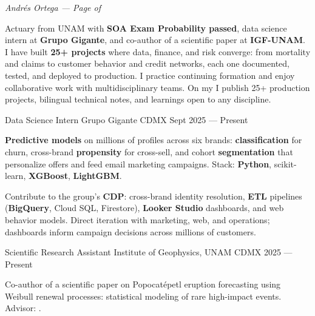 \documentclass[10pt, letterpaper]{awesome-cv}
\renewcommand{\acvSectionContentTopSkip}{0.3mm}
\renewenvironment{cvparagraph}{%
  \vspace{\acvSectionContentTopSkip}%
  \vspace{-3mm}%
  \paragraphstyle%
}{%
  \par%
  \vspace{0.3mm}%
}
\renewcommand*{\paragraphstyle}{\fontsize{8.5pt}{1.15em}\bodyfontlight\upshape\color{text}}
\begin{document}
\makecvheader[C]


\makecvfooter
  {}
  {\color{lightgray}\textit{\small Andrés Ortega — Page \thepage{} of \pageref*{LastPage}}}
  {}


\begin{cvparagraph}
Actuary from UNAM with \textbf{SOA Exam Probability passed}, data science intern at \textbf{Grupo Gigante}, and co-author of a scientific paper at \textbf{IGF-UNAM}. I have built \textbf{25+ projects} where data, finance, and risk converge: from mortality and claims to customer behavior and credit networks, each one documented, tested, and deployed to production. I practice continuing formation and enjoy collaborative work with multidisciplinary teams. On my  I publish 25+ production projects, bilingual technical notes, and learnings open to any discipline.
\end{cvparagraph}


\begin{cventries}

  \cventry
    {Data Science Intern}
    {Grupo Gigante}
    {CDMX}
    {Sept 2025 — Present}
    {
      \begin{cvitems}
        \item {\textbf{Predictive models} on millions of profiles across six brands: \textbf{classification} for churn, cross-brand \textbf{propensity} for cross-sell, and cohort \textbf{segmentation} that personalize offers and feed email marketing campaigns. Stack: \textbf{Python}, scikit-learn, \textbf{XGBoost}, \textbf{LightGBM}.}
        \item {Contribute to the group's \textbf{CDP}: cross-brand identity resolution, \textbf{ETL} pipelines (\textbf{BigQuery}, Cloud SQL, Firestore), \textbf{Looker Studio} dashboards, and web behavior models. Direct iteration with marketing, web, and operations; dashboards inform campaign decisions across millions of customers.}
      \end{cvitems}
    }

  \cventry
    {Scientific Research Assistant }
    {Institute of Geophysics, UNAM}
    {CDMX}
    {2025 — Present}
    {
      \begin{cvitems}
        \item {Co-author of a scientific paper on Popocatépetl eruption forecasting using Weibull renewal processes: statistical modeling of rare high-impact events. Advisor: .}
      \end{cvitems}
    }

\end{cventries}
\end{document}
